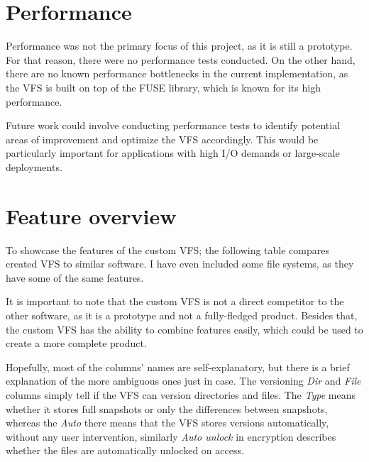 \section{Performance}\label{sec:performance}

Performance was not the primary focus of this project, as it is still a prototype.
For that reason, there were no performance tests conducted.
On the other hand, there are no known performance bottlenecks in the current implementation, as the VFS is built on top of the FUSE library, which is known for its high performance.

Future work could involve conducting performance tests to identify potential areas of improvement and optimize the VFS accordingly.
This would be particularly important for applications with high I/O demands or large-scale deployments.


\section{Feature overview}\label{sec:feature-overview}

To showcase the features of the custom VFS; the following table compares created VFS to similar software.
I have even included some file systems, as they have some of the same features.

It is important to note that the custom VFS is not a direct competitor to the other software, as it is a prototype and not a fully-fledged product.
Besides that, the custom VFS has the ability to combine features easily, which could be used to create a more complete product.

Hopefully, most of the columns' names are self-explanatory, but there is a brief explanation of the more ambiguous ones just in case.
The versioning \textit{Dir} and \textit{File} columns simply tell if the VFS can version directories and files.
The \textit{Type} means whether it stores full snapshots or only the differences between snapshots, whereas
the \textit{Auto} there means that the VFS stores versions automatically, without any user intervention, similarly
\textit{Auto unlock} in encryption describes whether the files are automatically unlocked on access.

\clearpage

\renewcommand{\checkmark}{\tikz\fill[scale=0.4](0,.35) -- (.25,0) -- (1,.7) -- (.25,.15) -- cycle;}

